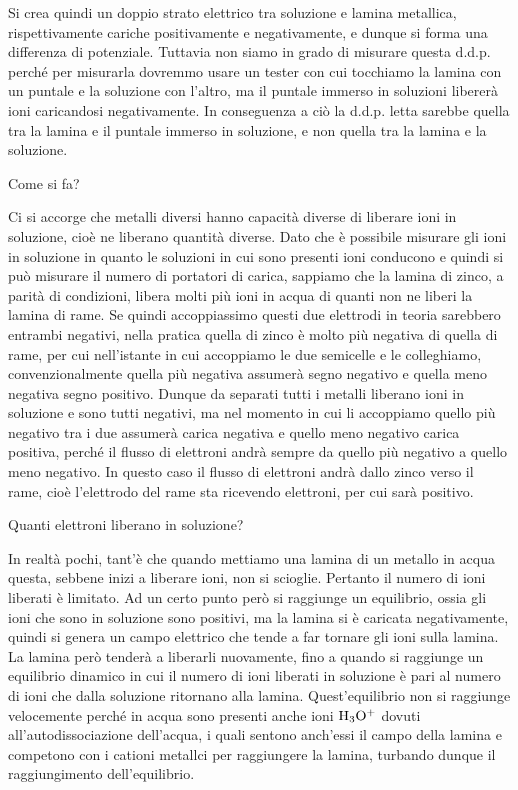 Si crea quindi un doppio strato elettrico tra soluzione e lamina metallica, rispettivamente cariche positivamente e negativamente, e dunque si forma una differenza di potenziale. Tuttavia non siamo in grado di misurare questa d.d.p. perché per misurarla dovremmo usare un tester con cui tocchiamo la lamina con un puntale e la soluzione con l'altro, ma il puntale immerso in soluzioni libererà ioni caricandosi negativamente. In conseguenza a ciò la d.d.p. letta sarebbe quella tra la lamina e il puntale immerso in soluzione, e non quella tra la lamina e la soluzione.

Come si fa?

Ci si accorge che metalli diversi hanno capacità diverse di liberare ioni in soluzione, cioè ne liberano quantità diverse. Dato che è possibile misurare gli ioni in soluzione in quanto le soluzioni in cui sono presenti ioni conducono e quindi si può misurare il numero di portatori di carica, sappiamo che la lamina di zinco, a parità di condizioni, libera molti più ioni in acqua di quanti non ne liberi la lamina di rame. Se quindi accoppiassimo questi due elettrodi in teoria sarebbero entrambi negativi, nella pratica quella di zinco è molto più negativa di quella di rame, per cui nell'istante in cui accoppiamo le due semicelle e le colleghiamo, convenzionalmente quella più negativa assumerà segno negativo e quella meno negativa segno positivo. Dunque da separati tutti i metalli liberano ioni in soluzione e sono tutti negativi, ma nel momento in cui li accoppiamo quello più negativo tra i due assumerà carica negativa e quello meno negativo carica positiva, perché il flusso di elettroni andrà sempre da quello più negativo a quello meno negativo. In questo caso il flusso di elettroni andrà dallo zinco verso il rame, cioè l'elettrodo del rame sta ricevendo elettroni, per cui sarà positivo.

Quanti elettroni liberano in soluzione?

In realtà pochi, tant'è che quando mettiamo una lamina di un metallo in acqua questa, sebbene inizi a liberare ioni, non si scioglie. Pertanto il numero di ioni liberati è limitato. Ad un certo punto però si raggiunge un equilibrio, ossia gli ioni che sono in soluzione sono positivi, ma la lamina si è caricata negativamente, quindi si genera un campo elettrico che tende a far tornare gli ioni sulla lamina. La lamina però tenderà a liberarli nuovamente, fino a quando si raggiunge un equilibrio dinamico in cui il numero di ioni liberati in soluzione è pari al numero di ioni che dalla soluzione ritornano alla lamina. Quest'equilibrio non si raggiunge velocemente perché in acqua sono presenti anche ioni $\rm H_3O^+$ dovuti all'autodissociazione dell'acqua, i quali sentono anch'essi il campo della lamina e competono con i cationi metallci per raggiungere la lamina, turbando dunque il raggiungimento dell'equilibrio.

